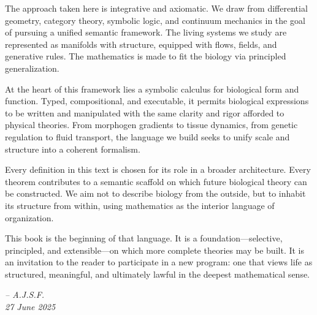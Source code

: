 The approach taken here is integrative and axiomatic. We draw from differential geometry, category theory, symbolic logic, and continuum mechanics in the goal of pursuing a unified semantic framework. The living systems we study are represented as manifolds with structure, equipped with flows, fields, and generative rules. The mathematics is made to fit the biology via principled generalization.

At the heart of this framework lies a symbolic calculus for biological form and function. Typed, compositional, and executable, it permits biological expressions to be written and manipulated with the same clarity and rigor afforded to physical theories. From morphogen gradients to tissue dynamics, from genetic regulation to fluid transport, the language we build seeks to unify scale and structure into a coherent formalism.

Every definition in this text is chosen for its role in a broader architecture. Every theorem contributes to a semantic scaffold on which future biological theory can be constructed. We aim not to describe biology from the outside, but to inhabit its structure from within, using mathematics as the interior language of organization.

This book is the beginning of that language. It is a foundation—selective, principled, and extensible—on which more complete theories may be built. It is an invitation to the reader to participate in a new program: one that views life as structured, meaningful, and ultimately lawful in the deepest mathematical sense.

\begin{flushright}
\textit{-- A.J.S.F. \\ 27 June 2025}
\end{flushright}
\pagebreak





%
%
%
%
%
%


\appendix

%
%
%


\newpage




